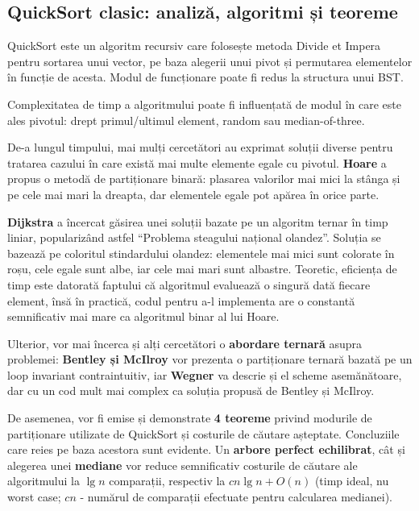 \documentclass[12pt,a4paper]{article}
\begin{document}
\begin{singlespace}
\section{QuickSort clasic: analiză, algoritmi și teoreme}
QuickSort este un algoritm recursiv care folosește metoda Divide et Impera 
pentru sortarea unui vector, pe baza alegerii unui pivot și permutarea elementelor în funcție de acesta. Modul de funcționare poate fi redus la structura unui BST.
\par
Complexitatea de timp a algoritmului poate fi influențată de modul în care este ales pivotul: drept primul/ultimul element, random sau median-of-three.
\par
De-a lungul timpului, mai mulți cercetători au exprimat soluții diverse pentru tratarea cazului în care există mai multe elemente egale cu pivotul. \textbf{Hoare} a propus o metodă de partiționare binară: plasarea valorilor mai mici la stânga și pe cele mai mari la dreapta, dar elementele egale pot apărea în orice parte.  
\par
\textbf{Dijkstra} a încercat găsirea unei soluții bazate pe un algoritm ternar în timp liniar, popularizând astfel “Problema steagului național olandez”. Soluția se bazează pe coloritul stindardului olandez: elementele mai mici sunt colorate în roșu, cele egale sunt albe, iar cele mai mari sunt albastre. Teoretic, eficiența de timp este datorată faptului că algoritmul evaluează o singură dată fiecare element, însă în practică, codul pentru a-l implementa are o constantă semnificativ mai mare ca algoritmul binar al lui Hoare.
\par
Ulterior, vor mai încerca și alți cercetători o \textbf{abordare ternară} asupra problemei: \textbf{Bentley și McIlroy} vor prezenta o partiționare ternară bazată pe un loop invariant contraintuitiv, iar \textbf{Wegner} va descrie și el scheme asemănătoare, dar cu un cod mult mai complex ca soluția propusă de Bentley și McIlroy.
\par
De asemenea, vor fi emise și demonstrate \textbf{4 teoreme} privind modurile de partiționare utilizate de QuickSort și costurile de căutare așteptate. Concluziile care reies pe baza acestora sunt evidente. Un \textbf{arbore perfect echilibrat}, cât și alegerea unei \textbf{mediane} vor reduce semnificativ costurile de căutare ale algoritmului la \(\lg n\) comparații, respectiv la \(cn \lg n + O(n)\) (timp ideal, nu worst case; \(cn\) - numărul de comparații efectuate pentru calcularea medianei).


\end{singlespace}
\end{document}
